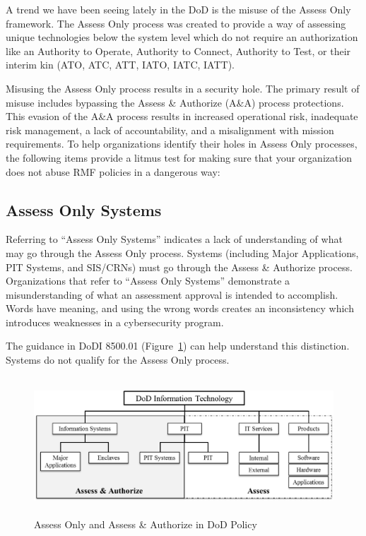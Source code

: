 A trend we have been seeing lately in the DoD is the misuse of the Assess Only framework. The Assess Only process was created to provide a way of assessing unique technologies below the system level which do not require an authorization like an Authority to Operate, Authority to Connect, Authority to Test, or their interim kin (ATO, ATC, ATT, IATO, IATC, IATT).\autocite[\pno~13]{20240212:dodi851001}

Misusing the Assess Only process results in a security hole. The primary result of misuse includes bypassing the Assess \& Authorize (A\&A) process protections. This evasion of the A\&A process results in increased operational risk, inadequate risk management, a lack of accountability, and a misalignment with mission requirements. To help organizations identify their holes in Assess Only processes, the following items provide a litmus test for making sure that your organization does not abuse RMF policies in a dangerous way:

\subsection{Assess Only Systems}
Referring to ``Assess Only Systems'' indicates a lack of understanding of what may go through the Assess Only process. Systems (including Major Applications, PIT Systems, and SIS/CRNs) must go through the Assess \& Authorize process. Organizations that refer to ``Assess Only Systems'' demonstrate a misunderstanding of what an assessment approval is intended to accomplish. Words have meaning, and using the wrong words creates an inconsistency which introduces weaknesses in a cybersecurity program.

The guidance in DoDI 8500.01 (Figure~\ref{fig:20240212:dodit}) can help understand this distinction.\autocite{20240212:dodi850001} Systems do not qualify for the Assess Only process.

\begin{figure}[h]
\centering
\includegraphics[width=14cm, height=5.144cm]{20240212.dodit.png}
\caption{Assess Only and Assess \& Authorize in DoD Policy}
\label{fig:20240212:dodit}
\end{figure}

